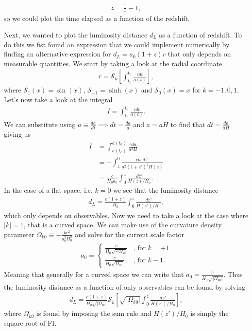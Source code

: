 \documentclass{emulateapj}
\begin{document}
	 \begin{align}
	 	z = \frac{1}{x} - 1,
	 \end{align}
	 so we could plot the time elapsed as a function of the redshift.
	 
	 Next, we wanted to plot the luminosity distance $d_L$ as a function of redshift. To do this we fist found an expression that we could implement numerically by finding an alternative expression for $d_L = a_0(1+z)r$ that only depends on measurable quantities. We start by taking a look at the radial coordinate 
	 \begin{align}
	 	r = \mathcal{S}_k\left[\int_{t_e}^{t_0}\frac{cdt}{a(t)}\right],
	 \end{align}
	 where $\mathcal{S}_1(x) = \sin(x)$, $\mathcal{S}_{-1} = \sinh(x)$ and $\mathcal{S}_0(x) = x$ for $k = -1,0,1$. Let's now take a look at the integral
	 \begin{align}
	 	I = \int_{t_e}^{t_0}\frac{cdt}{a(t)}.
	 \end{align} 
	 We can substitute using $\dot{a} \equiv \frac{da}{dt}\implies dt = \frac{da}{\dot{a}}$ and $\dot{a} = aH$ to find that $dt = \frac{da}{aH}$ giving us
	 \begin{align*}
	 	I &= \int_{a(t_e)}^{a(t_0)}\frac{cda}{a^2H}\\
	 	&= -\int_{z}^{0}\frac{ca_0dz'}{a^2(1+z')^2H(z)}\\
	 	& = \frac{c}{H_0a_0}\int_{0}^{z}\frac{dz'}{H(z)/H_0}.
	 \end{align*}
	 In the case of a flat space, i.e. $k=0$ we see that the luminosity distance
	 \begin{align}
	 	d_L = \frac{c(1+z)}{H_0}\int_{0}^{z}\frac{dz'}{H(z')/H_0},
	 \end{align}
	 which only depends on observables. Now we need to take a look at the case where $|k|=1$, that is a curved space. We can make use of the curvature density parameter $\Omega_{k0}\equiv -\frac{kc^2}{a_0^2H_0^2}$ and solve for the current scale factor 
	 \begin{align}
	 	a_0 = 
	 	\begin{cases}
	 	\frac{c}{H_0\sqrt{-\Omega_{k0}}}&\text{, for }k=+1\\
	 	\frac{c}{H_0\sqrt{\Omega_{k0}}}&\text{, for }k-1.
	 	\end{cases}
	 \end{align}
	 Meaning that generally for a curved space we can write that $a_0 = \frac{c}{H_0\sqrt{|\Omega_{k0}|}}$. Thus the luminosity distance as a function of only observables can be found by solving 
	 \begin{align}
	 	d_L = \frac{c(1+z)}{H_0\sqrt{|\Omega_{k0}|}}\mathcal{S}_k\left[\sqrt{|\Omega_{k0}|}\int_{0}^{z}\frac{dz'}{H(z')/H_0}\right],
	 \end{align}
	 where $\Omega_{k0}$ is found by imposing the sum rule and $H(z')/H_0$ is simply the square root of FI.
	 
\end{document}
